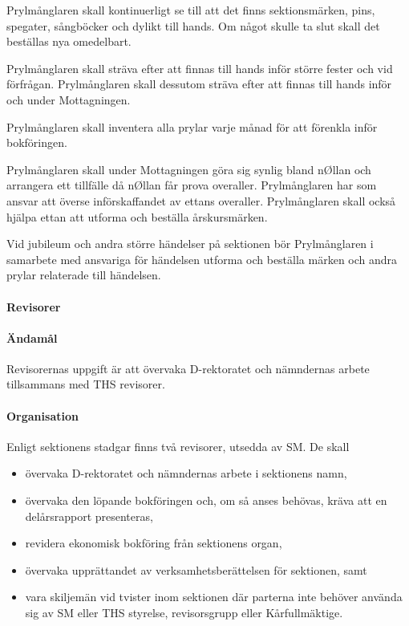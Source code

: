 \documentclass[a4paper,12pt]{article}
\begin{document}
Prylmånglaren skall kontinuerligt se till att det finns sektionsmärken, pins, spegater, sångböcker och dylikt till hands. Om något skulle ta slut skall det beställas nya omedelbart.

Prylmånglaren skall sträva efter att finnas till hands inför större fester och vid förfrågan. Prylmånglaren skall dessutom sträva efter att finnas till hands inför och under Mottagningen.

Prylmånglaren skall inventera alla prylar varje månad för att förenkla inför bokföringen.

Prylmånglaren skall under Mottagningen göra sig synlig bland nØllan och arrangera ett tillfälle då nØllan får prova overaller. Prylmånglaren har som ansvar att överse införskaffandet av ettans overaller. Prylmånglaren skall också hjälpa ettan att utforma och beställa årskursmärken.

Vid jubileum och andra större händelser på sektionen bör Prylmånglaren i samarbete med ansvariga för händelsen utforma och beställa märken och andra prylar relaterade till händelsen.

\paragraph{Revisorer}

\paragraph{Ändamål}

Revisorernas uppgift är att övervaka D-rektoratet och nämndernas arbete tillsammans med THS revisorer.

\paragraph{Organisation}

Enligt sektionens stadgar finns två revisorer, utsedda av SM. De skall

\begin{itemize}
  \item övervaka D-rektoratet och nämndernas arbete i sektionens namn,
  \item övervaka den löpande bokföringen och, om så anses behövas, kräva att en delårsrapport presenteras,
  \item revidera ekonomisk bokföring från sektionens organ,
  \item övervaka upprättandet av verksamhetsberättelsen för sektionen, samt
  \item vara skiljemän vid tvister inom sektionen där parterna inte behöver använda sig av SM eller THS styrelse, revisorsgrupp eller Kårfullmäktige.
\end{itemize}
\end{document}
